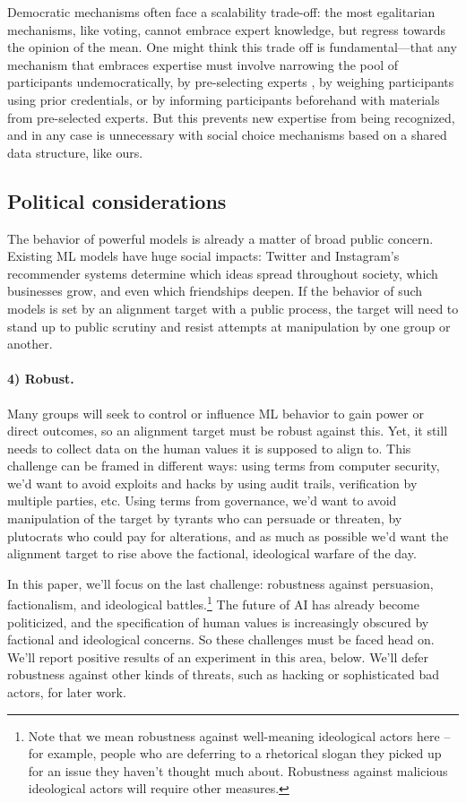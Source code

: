 \documentclass{article}
\theoremstyle{definition}
\begin{document}
Democratic mechanisms often face a scalability trade-off: the most egalitarian mechanisms, like voting, cannot embrace expert knowledge, but regress towards the opinion of the mean. One might think this trade off is fundamental---that any mechanism that embraces expertise must involve narrowing the pool of participants undemocratically, by pre-selecting experts \citep{chen2023case,konya2023democratic}, by weighing participants using prior credentials, or by informing participants beforehand with materials from pre-selected experts. But this prevents new expertise from being recognized, and in any case is unnecessary with social choice mechanisms based on a shared data structure, like ours.

\subsection{Political considerations}\label{sec:politicalconsiderations}
The behavior of powerful models is already a matter of broad public concern. Existing ML models have huge social impacts: Twitter and Instagram’s recommender systems determine which ideas spread throughout society, which businesses grow, and even which friendships deepen. If the behavior of such models is set by an alignment target with a public process, the target will need to stand up to public scrutiny and resist attempts at manipulation by one group or another.

\paragraph{4) Robust.} Many groups will seek to control or influence ML behavior to gain power or direct outcomes, so an alignment target must be robust against this. Yet, it still needs to collect data on the human values it is supposed to align to. This challenge can be framed in different ways: using terms from computer security, we’d want to avoid exploits and hacks by using audit trails, verification by multiple parties, etc. Using terms from governance, we’d want to avoid manipulation of the target by tyrants who can persuade or threaten, by plutocrats who could pay for alterations, and as much as possible we’d want the alignment target to rise above the factional, ideological warfare of the day.

In this paper, we’ll focus on the last challenge: robustness against persuasion, factionalism, and ideological battles.\footnote{Note that we mean robustness against well-meaning ideological actors here – for example, people who are deferring to a rhetorical slogan they picked up for an issue they haven't thought much about. Robustness against malicious ideological actors will require other measures.} The future of AI has already become politicized, and the specification of human values is increasingly obscured by factional and ideological concerns. So these challenges must be faced head on. We'll report positive results of an experiment in this area, below. We’ll defer robustness against other kinds of threats, such as hacking or sophisticated bad actors, for later work.
\end{document}

